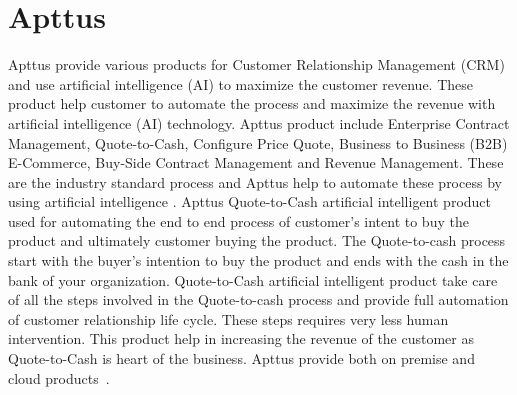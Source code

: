 \section{Apttus}
  

Apttus provide various products for Customer Relationship Management
(CRM) and use artificial intelligence (AI) to maximize the customer
revenue. These product help customer to automate the process and
maximize the revenue with artificial intelligence (AI)
technology. Apttus product include Enterprise Contract Management,
Quote-to-Cash, Configure Price Quote, Business to Business (B2B)
E-Commerce, Buy-Side Contract Management and Revenue Management. These
are the industry standard process and Apttus help to automate these
process by using artificial intelligence . Apttus Quote-to-Cash
artificial intelligent product used for automating the end to end
process of customer's intent to buy the product and ultimately
customer buying the product. The Quote-to-cash process start with the
buyer's intention to buy the product and ends with the cash in the
bank of your organization. Quote-to-Cash artificial intelligent
product take care of all the steps involved in the Quote-to-cash
process and provide full automation of customer relationship life
cycle. These steps requires very less human intervention. This product
help in increasing the revenue of the customer as Quote-to-Cash is
heart of the business. Apttus provide both on premise and cloud
products~\cite{hid-sp18-511-apttus}.
 
